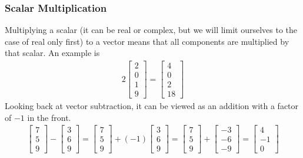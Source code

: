 \subsubsection{Scalar Multiplication} 
Multiplying a scalar (it can be real or complex, but we will limit ourselves to the case of real only first) to a vector means that all components are multiplied by that scalar. An example is
\begin{align*}
2
\begin{bmatrix}
2 \\
0 \\
1 \\
9
\end{bmatrix}
=
\begin{bmatrix}
4 \\
0 \\
2 \\
18
\end{bmatrix}
\end{align*}
Looking back at vector subtraction, it can be viewed as an addition with a factor of $-1$ in the front.
\begin{align*}
\begin{bmatrix}
7 \\
5 \\
9
\end{bmatrix}
-
\begin{bmatrix}
3 \\
6 \\
9
\end{bmatrix}
=
\begin{bmatrix}
7 \\
5 \\
9
\end{bmatrix}
+ (-1)
\begin{bmatrix}
3 \\
6 \\
9
\end{bmatrix}
=
\begin{bmatrix}
7 \\
5 \\
9
\end{bmatrix}
+
\begin{bmatrix}
-3 \\
-6 \\
-9
\end{bmatrix}
=
\begin{bmatrix}
4 \\
-1 \\
0
\end{bmatrix}
\end{align*}

